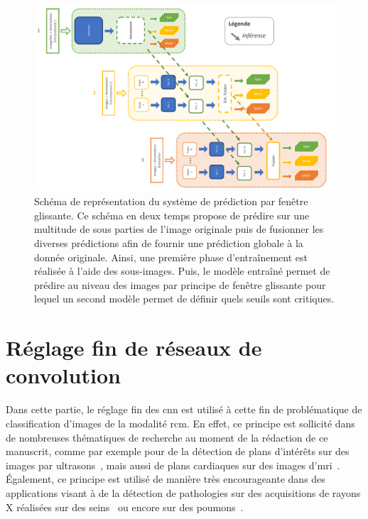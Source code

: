\begin{figure}[H]
    \centering
    \includegraphics[width=\linewidth]{contents/chapter_6/resources/scheme_image_improvement_sliding_features.pdf}
    \caption{Schéma de représentation du système de prédiction par fenêtre glissante. Ce schéma en deux temps propose de prédire sur une multitude de sous parties de l'image originale puis de fusionner les diverses prédictions afin de fournir une prédiction globale à la donnée originale. Ainsi, une première phase d'entraînement est réalisée à l'aide des sous-images. Puis, le modèle entraîné permet de prédire au niveau des images par principe de fenêtre glissante pour lequel un second modèle permet de définir quels seuils sont critiques.}
    \label{fig:scheme_image_improvement_sliding_features}
\end{figure}\par
\clearpage

\section{Réglage fin de réseaux de convolution}
Dans cette partie, le réglage fin des \gls{cnn} est utilisé à cette fin de problématique de classification d'images de la modalité \gls{rcm}. En effet, ce principe est sollicité dans de nombreuses thématiques de recherche au moment de la rédaction de ce manuscrit, comme par exemple pour de la détection de plans d'intérêts sur des images par ultrasons~\cite{Chen2015}, mais aussi de plans cardiaques sur des images d'\gls{mri}~\cite{Margeta2017}. Également, ce principe est utilisé de manière très encourageante dans des applications visant à de la détection de pathologies sur des acquisitions de rayons X réalisées sur des seins~\cite{Lotter2017} ou encore sur des poumons~\cite{Gao2018}.\par

